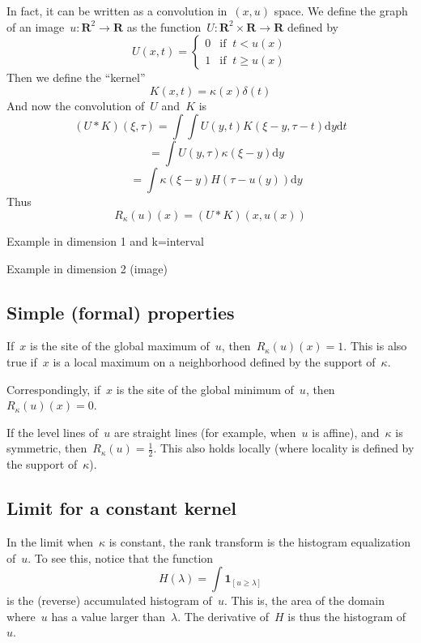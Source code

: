 \documentclass[12pt]{article}                  %
\begin{document}
In fact, it can be written as a convolution in~$(x,u)$ space.  We define the
graph of an image~$u:\mathbf{R}^2\to\mathbf{R}$ as the
function~$U:\mathbf{R}^2\times\mathbf{R}\to\mathbf{R}$ defined by
\[
	U(x,t) = \begin{cases}
		0 & \textrm{if $\ t< u(x)$} \\
		1 & \textrm{if $\ t\ge u(x)$}
	\end{cases}
\]
Then we define the ``kernel''
\[
	K(x,t) = \kappa(x)\delta(t)
\]
And now the convolution of~$U$ and~$K$ is
\[
	(U*K)(\xi,\tau)
	=
	\int
	\int U\left(y,t\right)K\left(\xi-y,\tau-t\right)
		\mathrm{d} y
		\mathrm{d} t
\]
\[
	\quad
	=\int
	U(y,\tau)
	\kappa(\xi - y)
		\mathrm{d} y
\]
\[
	\quad
	=\int\kappa(\xi-y)H(\tau - u(y))
		\mathrm{d} y
\]
Thus
\begin{equation}\label{eq:convolution1}
	R_\kappa(u)(x)=(U*K)(x,u(x))
\end{equation}

Example in dimension 1 and k=interval

Example in dimension 2 (image)

\subsection{Simple (formal) properties}

If~$x$ is the site of the global maximum of~$u$, then~$R_\kappa(u)(x)=1$.
This is also true if~$x$ is a local maximum on a neighborhood defined by the
support of~$\kappa$.

Correspondingly, if~$x$ is the site of the global minimum of~$u$,
then~$R_\kappa(u)(x)=0$.

If the level lines of~$u$ are straight lines (for example, when~$u$ is
affine), and~$\kappa$ is symmetric, then~$R_\kappa(u)=\frac12$.  This also
holds locally (where locality is defined by the support of~$\kappa$).




\subsection{Limit for a constant kernel}

In the limit when~$\kappa$ is constant, the rank transform is the histogram
equalization of~$u$.  To see this, notice that the function
\[
H(\lambda) = \int\mathbf{1}_{[u\ge\lambda]}
\]
is the (reverse) accumulated histogram of~$u$.  This is, the area of the domain
where~$u$ has a value larger than~$\lambda$.  The derivative of~$H$ is thus the
histogram of~$u$.
\end{document}
